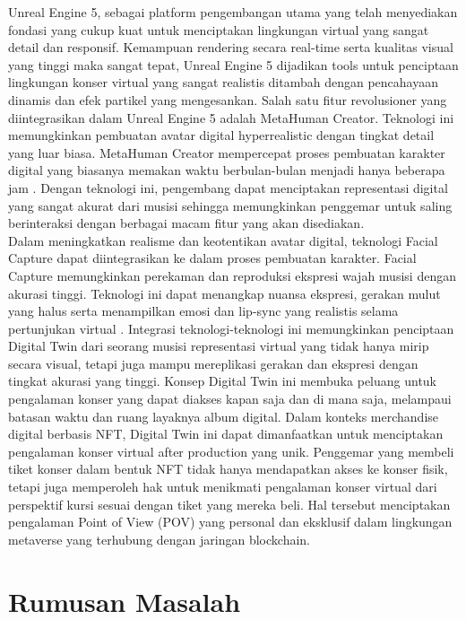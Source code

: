 Unreal Engine 5, sebagai platform pengembangan utama yang telah menyediakan fondasi yang cukup kuat untuk menciptakan
lingkungan virtual yang sangat detail dan responsif. Kemampuan rendering secara real-time serta kualitas visual yang
tinggi maka sangat tepat, Unreal Engine 5 dijadikan tools untuk penciptaan lingkungan konser virtual yang sangat 
realistis ditambah dengan pencahayaan dinamis dan efek partikel yang mengesankan. Salah satu fitur revolusioner yang
diintegrasikan dalam Unreal Engine 5 adalah MetaHuman Creator. Teknologi ini memungkinkan pembuatan avatar digital 
hyperrealistic dengan tingkat detail yang luar biasa. MetaHuman Creator mempercepat proses pembuatan karakter digital
yang biasanya memakan waktu berbulan-bulan menjadi hanya beberapa jam \parencite{EpicGames2021}. Dengan teknologi ini, pengembang dapat 
menciptakan representasi digital yang sangat akurat dari musisi sehingga memungkinkan penggemar untuk saling  
berinteraksi dengan berbagai macam fitur yang akan disediakan.
\\

Dalam meningkatkan realisme dan keotentikan avatar digital, teknologi Facial Capture dapat diintegrasikan ke dalam 
proses pembuatan karakter. Facial Capture memungkinkan perekaman dan reproduksi ekspresi wajah musisi dengan akurasi 
tinggi. Teknologi ini dapat menangkap nuansa ekspresi, gerakan mulut yang halus serta menampilkan emosi dan lip-sync 
yang realistis selama pertunjukan virtual \parencite{Zeng2020}. Integrasi teknologi-teknologi ini memungkinkan penciptaan Digital Twin
dari seorang musisi \- representasi virtual yang tidak hanya mirip secara visual, tetapi juga mampu mereplikasi gerakan
dan ekspresi dengan tingkat akurasi yang tinggi. Konsep Digital Twin ini membuka peluang untuk pengalaman konser yang
dapat diakses kapan saja dan di mana saja, melampaui batasan waktu dan ruang layaknya album digital. Dalam konteks 
merchandise digital berbasis NFT, Digital Twin ini dapat dimanfaatkan untuk menciptakan pengalaman konser virtual 
after production yang unik. Penggemar yang membeli tiket konser dalam bentuk NFT tidak hanya mendapatkan akses ke 
konser fisik, tetapi juga memperoleh hak untuk menikmati pengalaman konser virtual dari perspektif kursi sesuai dengan
tiket yang mereka beli. Hal tersebut menciptakan pengalaman Point of View (POV) yang personal dan eksklusif dalam 
lingkungan metaverse yang terhubung dengan jaringan blockchain.

\section{Rumusan Masalah}

